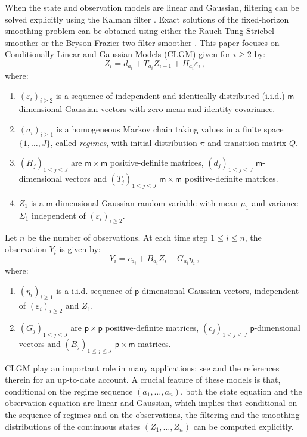\documentclass[nolayout]{article}
\theoremstyle{plain}
\theoremstyle{definition}
\newcommand{\1}{\mathbbm{1}}
\def\dimy{\mathsf{p}}
\def\dimz{\mathsf{m}}
\def\eqsp{\,}
\begin{document}
When the state and observation models are linear and Gaussian, filtering can be solved explicitly using the Kalman filter \cite{kalman:1960}. Exact solutions of the fixed-horizon smoothing problem can be obtained using either the Rauch-Tung-Striebel smoother \cite{rauch:striebel:tung:1965} or the Bryson-Frazier two-filter smoother \cite{bryson:frazier:1963}. 
This paper focuses on  Conditionally Linear and Gaussian Models (CLGM) given for $i\ge 2$ by:
\begin{equation}
\label{eq:model:state}
Z_i = d_{a_{i}} + T_{a_{i}}Z_{i-1}+H_{a_{i}}\varepsilon_i\eqsp,
\end{equation}
where:
\begin{enumerate}[-]
\item $(\varepsilon_i)_{i\ge 2}$ is a sequence of independent and identically distributed (i.i.d.) $\dimz$-dimensional Gaussian vectors with zero mean and identity covariance.
\item $(a_i)_{i\ge 1}$ is a homogeneous Markov chain taking values in a finite space $\{1,\ldots,J\}$, called \emph{regimes}, with initial distribution $\pi$ and transition matrix $Q$.  
\item $(H_j)_{1\le j\le J}$ are $\dimz \times \dimz$ positive-definite matrices, $(d_j)_{1\le j\le J}$ $\dimz$-dimensional vectors and $(T_j)_{1\le j\le J}$ $\dimz \times \dimz$ positive-definite matrices.
\item $Z_1$ is a $\dimz$-dimensional Gaussian random variable with mean $\mu_1$ and variance $\Sigma_1$ independent of $(\varepsilon_i)_{i\ge 2}$.
\end{enumerate}
Let $n$ be the number of observations. At each time step $1\le i \le n$, the observation $Y_i$ is given by:
\begin{equation}
\label{eq:model:obs}
Y_i = c_{a_i} + B_{a_i}Z_i + G_{a_i}\eta_i\eqsp,
\end{equation}
where:
\begin{enumerate}[-]
\item $(\eta_i)_{i\ge 1}$ is a i.i.d. sequence of $\dimy$-dimensional Gaussian vectors, independent of $(\varepsilon_i)_{i\ge 2}$ and $Z_1$.
\item $(G_j)_{1\le j \le J}$ are $\dimy \times \dimy$ positive-definite matrices, $(c_j)_{1\le j \le J}$ $\dimy$-dimensional vectors and $(B_j)_{1\le j \le J}$ $\dimy \times \dimz$ matrices.
\end{enumerate}
CLGM play an important role in many applications; see \cite{sarkka:2013} and the references therein for an up-to-date account. A crucial feature of these models is that, conditional on the regime sequence $(a_1,\ldots,a_n)$, both the state equation and the observation equation are linear and Gaussian, which implies that conditional on the sequence of regimes and on the observations, the filtering and the smoothing distributions of the continuous states $(Z_1,\dots,Z_n)$ can be computed explicitly.
\end{document}
